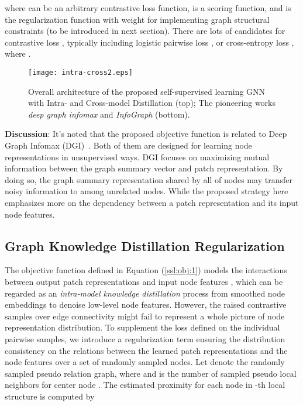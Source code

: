 \documentclass[preprint]{article}
\begin{document}
where  can be an arbitrary contrastive loss function,  is a scoring function, and  is the regularization function with weight  for implementing graph structural constraints (to be introduced in next section). There are lots of candidates for contrastive loss , typically including logistic pairwise loss , or cross-entropy loss , where . 
\begin{figure}
    \centering
    \label{overall:architecture}
    \texttt{[image: intra-cross2.eps]}
    \caption{Overall architecture of the proposed self-supervised learning GNN with Intra- and Cross-model Distillation (top); The pioneering works  \emph{deep graph infomax} and \emph{InfoGraph} (bottom).}
    \label{fig:my_label}
\end{figure}

\textbf{Discussion}: It's noted that the proposed objective function is related to Deep Graph Infomax (DGI)~\cite{velivckovic2018deep}. Both of them are designed for learning  node representations in unsupervised ways. DGI focuses on maximizing mutual information between the graph summary vector and patch representation. By doing so, the graph summary representation shared by all of nodes may transfer noisy information to among unrelated nodes. While the proposed strategy here emphasizes more on the dependency   between a patch representation and its input node features.



\subsection{Graph Knowledge Distillation Regularization}

The objective function defined in Equation (\ref{ssl:obj:1}) models the interactions between output patch representations  and input node features , which can be regarded as an \emph{intra-model knowledge distillation} process from smoothed node embeddings to denoise low-level node features.
However,  the raised contrastive samples over edge connectivity might fail to represent a whole picture of node representation distribution.  To supplement the loss defined on the individual pairwise  samples,    we introduce a regularization term ensuring the distribution consistency on the relations between the learned patch representations  and the node features  over a set of randomly sampled nodes.
Let  denote the randomly sampled pseudo relation graph, where  and  is the number of sampled pseudo local neighbors for center node . The estimated proximity for each node in -th local structure  is computed by
\end{document}
